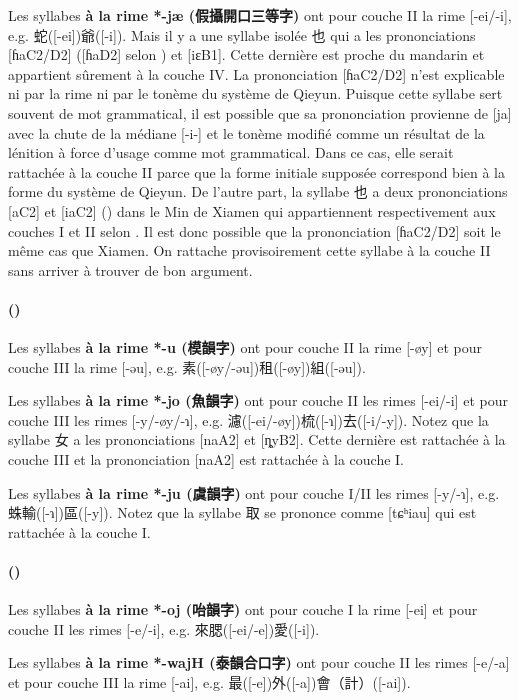 \documentclass{scrbook}
\newcounter{c}[subsubsection]
\newcommand{\stpc}[1]{\stepcounter{#1}}
\newcommand{\termyyx}[1]{\textbf{#1}}
\begin{document}
\begin{sloppypar}
Les syllabes \termyyx{à la rime *-jæ (假攝開口三等字)} ont pour couche II la rime [-ei/-i], e.g. 蛇([-ei])爺([-i]). Mais il y a une syllabe isolée 也 qui a les prononciations [ɦaC2/D2] ([ɦaD2] selon \cite[89]{Pan1998wenzhou}) et [iɛB1]. Cette dernière est proche du mandarin et appartient sûrement à la couche IV. La prononciation [ɦaC2/D2] n'est explicable ni par la rime ni par le tonème du système de Qieyun. Puisque cette syllabe sert souvent de mot grammatical, il est possible que sa prononciation provienne de [ja] avec la chute de la médiane [-i-] et le tonème modifié comme un résultat de la lénition à force d'usage comme mot grammatical. Dans ce cas, elle serait rattachée à la couche II parce que la forme initiale supposée correspond bien à la forme du système de Qieyun. De l'autre part, la syllabe 也 a deux prononciations [aC2] et [iaC2] (\cite[37, 42]{Zhou1998Xiamen}) dans le Min de Xiamen qui appartiennent respectivement aux couches I et II selon \textcite[124]{Zhou1998Xiamen}. Il est donc possible que la prononciation [ɦaC2/D2] soit le même cas que Xiamen. On rattache provisoirement cette syllabe à la couche II sans arriver à trouver de bon argument.

\stpc{c}\paragraph{()}
Les syllabes \termyyx{à la rime *-u (模韻字)} ont pour couche II la rime [-øy] et pour couche III la rime [-əu], e.g. 素([-øy/-əu])租([-øy])組([-əu]).

Les syllabes \termyyx{à la rime *-jo (魚韻字)} ont pour couche II les rimes [-ei/-i] et pour couche III les rimes [-y/-øy/-ɿ], e.g. 濾([-ei/-øy])梳([-ɿ])去([-i/-y]). Notez que la syllabe 女 a les prononciations [naA2] et [ȵyB2]. Cette dernière est rattachée à la couche III et la prononciation [naA2] est rattachée à la couche I.

Les syllabes \termyyx{à la rime *-ju (虞韻字)} ont pour couche I/II les rimes [-y/-ɿ], e.g. 蛛輸([-ɿ])區([-y]). Notez que la syllabe 取 se prononce comme [tɕʰiau] qui est rattachée à la couche I.

\stpc{c}\paragraph{()}
Les syllabes \termyyx{à la rime *-oj (咍韻字)} ont pour couche I la rime [-ei] et pour couche II les rimes [-e/-i], e.g. 來腮([-ei/-e])愛([-i]).

Les syllabes \termyyx{à la rime *-wajH (泰韻合口字)} ont pour couche II les rimes [-e/-a] et pour couche III la rime [-ai], e.g. 最([-e])外([-a])會（計）([-ai]).


\end{sloppypar}
\end{document}
